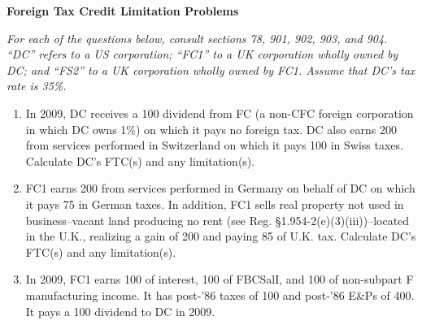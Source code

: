 	\begin{center}
		\textbf{Foreign Tax Credit Limitation Problems}
	\end{center}
	\begin{select}
	
\emph{For each of the questions below, consult sections 78, 901, 902, 903, and 904.  ``DC'' refers to a US corporation; ``FC1'' to a UK corporation wholly owned by DC; and  ``FS2'' to a UK corporation wholly owned by FC1.  Assume that DC's tax rate is 35\%.}  

	\begin{enumerate}
	
	\item In 2009, DC receives a 100 dividend from FC (a non-CFC foreign corporation in which DC owns 1\%) on which it pays no foreign tax.  DC also earns  200 from services performed in Switzerland on which it pays 100 in Swiss taxes.  Calculate DC's FTC(s) and any limitation(s).
	
		\item FC1 earns 200 from services performed in Germany on behalf of DC on which it pays 75 in German taxes.  In addition, FC1 sells real  property not used in business--vacant land producing no rent (see Reg. \S1.954-2(e)(3)(iii))--located in the U.K., realizing a gain of 200 and paying 85 of U.K. tax.  Calculate DC's FTC(s) and any limitation(s). 
 
 		\item In 2009, FC1 earns 100 of interest, 100 of FBCSalI, and 100 of non-subpart F manufacturing income.  It has post-'86 taxes of 100 and post-'86 E\&Ps of 400.  It pays a 100 dividend to DC in 2009.
	
		
		\end{enumerate}
		\end{select} 
 
